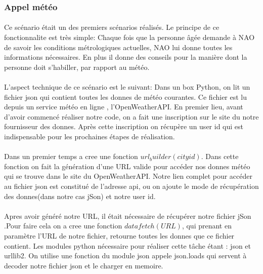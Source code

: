 \documentclass[a4paper,11pt]{article}
\begin{document}
	\subsubsection{Appel météo}
	\paragraph {}Ce scénario était un des premiers scénarios réalisés. Le principe de ce fonctionnalite est très simple: Chaque fois que la personne âgée demande à NAO de savoir les conditions métrologiques actuelles, NAO lui donne toutes les informations nécessaires.
En plus il donne des conseils pour la manière dont la personne doit s'habiller, par rapport au météo.
\paragraph{} L'aspect technique de ce scénario est le suivant:
\newline Dans un box Python, on lit un fichier json qui contient toutes les donnes de météo courantes. Ce fichier est lu depuis un service météo en ligne , l'OpenWeatherAPI.
En premier lieu, avant d'avoir commencé réaliser notre code, on a fait une inscription sur le site du notre fournisseur des donnes. Après cette inscription on récupère un user id qui est indispensable pour les prochaines étapes de réalisation. 
\paragraph{} Dans un premier temps a cree une fonction $url_ builder(city id)$. Dans cette fonction on fait la génération d'une URL valide pour accéder nos donnes météo qui se trouve dans le site du OpenWeatherAPI. Notre lien complet pour accéder au fichier json est constitué de l'adresse api, ou on ajoute le mode de récupération des donnes(dans notre cas jSon) et notre user id.
\paragraph{} Apres avoir généré notre URL, il était nécessaire de récupérer notre fichier jSon .Pour faire cela on a cree une fonction $datafetch(URL)$, qui prenant en paramètre l'URL de notre fichier, retourne toutes les donnes que ce fichier contient. Les modules python nécessaire pour réaliser cette tâche étant : json et urllib2.
\newline On utilise une fonction du module json appele json.loads qui servent à decoder notre fichier json et le charger en memoire. 
\end{document}
